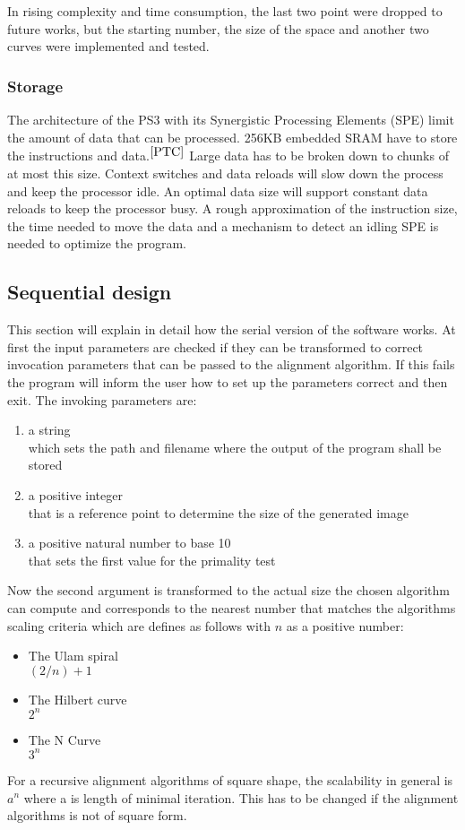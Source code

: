 In rising complexity and time consumption, the last two point were dropped to future works, but the starting number, the size of the space and another two curves were implemented and tested.

\subsubsection{Storage}
\label{sec:concurrency}
The architecture of the PS3 with its Synergistic Processing Elements (SPE) limit the amount of data that can be processed. 256KB embedded SRAM have to store the instructions and data.$^{\cite{PTC}}$
Large data has to be broken down to chunks of at most this size. Context switches and data reloads will slow down the process and keep the processor idle. An optimal data size will support constant data reloads to keep the processor busy. A rough approximation of the instruction size, the time needed to move the data and a mechanism to detect an idling SPE is needed to optimize the program.

\subsection{Sequential design}
\label{sec:serial_design}
This section will explain in detail how the serial version of the software works.
At first the input parameters are checked if they can be transformed to correct invocation parameters that can be passed to the alignment algorithm. If this fails the program will inform the user how to set up the parameters correct and then exit.
The invoking parameters are:

\begin{enumerate}
   \item a string\\ which sets the path and filename where the output of the program shall be stored
   \item a positive integer\\ that is a reference point to determine the size of the generated image
   \item a positive natural number to base 10\\ that sets the first value for the primality test
\end{enumerate}

Now the second argument is transformed to the actual size the chosen algorithm can compute and corresponds to the nearest number that matches the algorithms scaling criteria which are defines as follows with $n$ as a positive number:
\begin{itemize}
   \item The Ulam spiral\\
      $(2/n)+1$
   \item The Hilbert curve\\
      $2^n$
   \item The N Curve\\
      $3^n$
\end{itemize}
For a recursive alignment algorithms of square shape, the scalability in general is $a^n$ where a is length of minimal iteration. This has to be changed if the alignment algorithms is not of square form.


